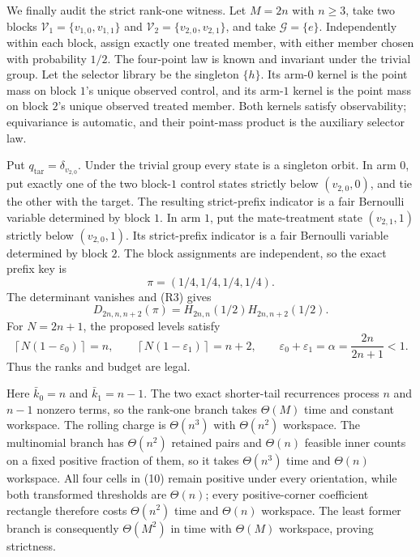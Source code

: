 We finally audit the strict rank-one witness. Let \(M=2n\) with \(n\ge3\), take two blocks \(\mathcal V_1=\{v_{1,0},v_{1,1}\}\) and \(\mathcal V_2=\{v_{2,0},v_{2,1}\}\), and take \(\mathcal G=\{e\}\). Independently within each block, assign exactly one treated member, with either member chosen with probability \(1/2\). The four-point law is known and invariant under the trivial group. Let the selector library be the singleton \(\{h\}\). Its arm-\(0\) kernel is the point mass on block \(1\)'s unique observed control, and its arm-\(1\) kernel is the point mass on block \(2\)'s unique observed treated member. Both kernels satisfy observability; equivariance is automatic, and their point-mass product is the auxiliary selector law.

Put \(q_{\mathrm{tar}}=\delta_{v_{2,0}}\). Under the trivial group every state is a singleton orbit. In arm \(0\), put exactly one of the two block-\(1\) control states strictly below \((v_{2,0},0)\), and tie the other with the target. The resulting strict-prefix indicator is a fair Bernoulli variable determined by block \(1\). In arm \(1\), put the mate-treatment state \((v_{2,1},1)\) strictly below \((v_{2,0},1)\). Its strict-prefix indicator is a fair Bernoulli variable determined by block \(2\). The block assignments are independent, so the exact prefix key is
\[
\pi=(1/4,1/4,1/4,1/4).
\tag{10}
\]
The determinant vanishes and (R3) gives
\[
D_{2n,n,n+2}(\pi)=H_{2n,n}(1/2)H_{2n,n+2}(1/2).
\tag{11}
\]
For \(N=2n+1\), the proposed levels satisfy
\[
\left\lceil N(1-\varepsilon_0)\right\rceil=n,
\qquad
\left\lceil N(1-\varepsilon_1)\right\rceil=n+2,
\qquad
\varepsilon_0+\varepsilon_1=\alpha=\frac{2n}{2n+1}<1.
\tag{12}
\]
Thus the ranks and budget are legal.

Here \(\bar k_0=n\) and \(\bar k_1=n-1\). The two exact shorter-tail recurrences process \(n\) and \(n-1\) nonzero terms, so the rank-one branch takes \(\Theta(M)\) time and constant workspace. The rolling charge is \(\Theta(n^3)\) with \(\Theta(n^2)\) workspace. The multinomial branch has \(\Theta(n^2)\) retained pairs and \(\Theta(n)\) feasible inner counts on a fixed positive fraction of them, so it takes \(\Theta(n^3)\) time and \(\Theta(n)\) workspace. All four cells in (10) remain positive under every orientation, while both transformed thresholds are \(\Theta(n)\); every positive-corner coefficient rectangle therefore costs \(\Theta(n^2)\) time and \(\Theta(n)\) workspace. The least former branch is consequently \(\Theta(M^2)\) in time with \(\Theta(M)\) workspace, proving strictness.